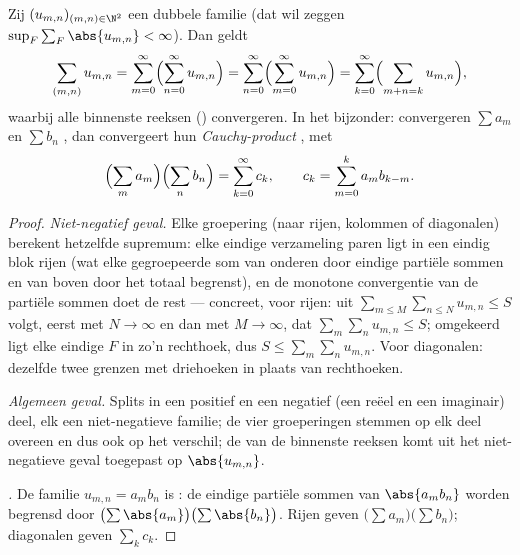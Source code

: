 \begin{theorem}\label{thm:b2:series:fubini}
Zij $(u_{m,n})_{(m,n) \in \N^2}$ een  dubbele familie
(dat wil zeggen $\sup_F \sum_F \abs{u_{m,n}} < \infty$). Dan
geldt
\[
\sum_{(m,n)} u_{m,n}
= \sum_{m=0}^{\infty}\Bigl(\sum_{n=0}^{\infty} u_{m,n}\Bigr)
= \sum_{n=0}^{\infty}\Bigl(\sum_{m=0}^{\infty} u_{m,n}\Bigr)
= \sum_{k=0}^{\infty}\Bigl(\sum_{m+n=k} u_{m,n}\Bigr),
\]
waarbij alle binnenste reeksen () convergeren. In het
bijzonder: convergeren $\sum a_m$ en $\sum b_n$ , dan
convergeert hun \emph{Cauchy-product}
, met
\[
\Bigl(\sum_m a_m\Bigr)\Bigl(\sum_n b_n\Bigr)
= \sum_{k=0}^{\infty} c_k,
\qquad
c_k = \sum_{m=0}^{k} a_m b_{k-m} .
\]
\end{theorem}

\begin{proof}
\emph{Niet-negatief geval.} Elke groepering (naar rijen, kolommen
of diagonalen) berekent hetzelfde supremum: elke eindige
verzameling paren ligt in een eindig blok rijen (wat elke
gegroepeerde som van onderen door eindige partiële sommen en van
boven door het totaal begrenst), en de monotone convergentie van de
partiële sommen doet de rest --- concreet, voor rijen: uit
$\sum_{m \leq M}\sum_{n \leq N} u_{m,n} \leq S$ volgt, eerst met $N
\to \infty$ en dan met $M \to \infty$, dat $\sum_m \sum_n u_{m,n}
\leq S$; omgekeerd ligt elke eindige $F$ in zo'n rechthoek, dus $S
\leq \sum_m\sum_n u_{m,n}$. Voor diagonalen: dezelfde twee grenzen
met driehoeken in plaats van rechthoeken.

\emph{Algemeen geval.} Splits in een positief en een negatief (een
reëel en een imaginair) deel, elk een  niet-negatieve
familie; de vier groeperingen stemmen op elk deel overeen en dus
ook op het verschil; de  van de binnenste
reeksen komt uit het niet-negatieve geval toegepast op
$\abs{u_{m,n}}$.

\emph{.} De familie $u_{m,n} = a_m b_n$ is
: de eindige partiële sommen van $\abs{a_mb_n}$ worden
begrensd door $\bigl(\sum\abs{a_m}\bigr)\bigl(\sum\abs{b_n}\bigr)$.
Rijen geven $\bigl(\sum a_m\bigr)\bigl(\sum b_n\bigr)$; diagonalen
geven $\sum_k c_k$.
\end{proof}


